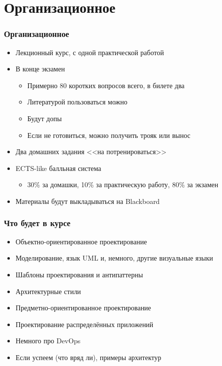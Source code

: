 \documentclass{../slides-style}
\begin{document}
    \begin{frame}[plain]
        \titlepage
    \end{frame}

    \section{Организационное}

    \begin{frame}
        \frametitle{Организационное}
        \begin{itemize}
            \item Лекционный курс, с одной практической работой
            \item В конце экзамен
            \begin{itemize}
                \item Примерно 80 коротких вопросов всего, в билете два
                \item Литературой пользоваться можно
                \item Будут допы
                \item Если не готовиться, можно получить трояк или вынос
            \end{itemize}
            \item Два домашних задания <<на потренироваться>>
            \item ECTS-like балльная система
            \begin{itemize}
                \item 30\% за домашки, 10\% за практическую работу, 80\% за экзамен
            \end{itemize}
            \item Материалы будут выкладываться на Blackboard
        \end{itemize}
    \end{frame}

    \begin{frame}
        \frametitle{Что будет в курсе}
        \begin{itemize}
            \item Объектно-ориентированное проектирование
            \item Моделирование, язык UML и, немного, другие визуальные языки
            \item Шаблоны проектирования и антипаттерны
            \item Архитектурные стили
            \item Предметно-ориентированное проектирование
            \item Проектирование распределённых приложений
            \item Немного про DevOps
            \item Если успеем (что вряд ли), примеры архитектур
        \end{itemize}
    \end{frame}
\end{document}
